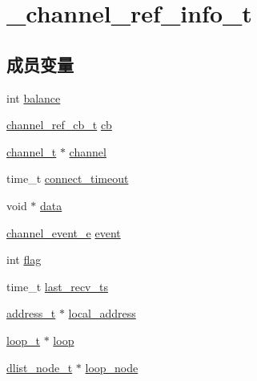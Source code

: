 \hypertarget{struct__channel__ref__info__t}{}\section{\+\_\+channel\+\_\+ref\+\_\+info\+\_\+t}
\label{struct__channel__ref__info__t}
\subsection*{成员变量}
\begin{DoxyCompactItemize}
\item 
int \hyperlink{struct__channel__ref__info__t_ac794434112478f3134ad93778a0f2860}{balance}
\item 
\hyperlink{config_8h_ae296ec4d1ce108960de8dcc423956a1d}{channel\+\_\+ref\+\_\+cb\+\_\+t} \hyperlink{struct__channel__ref__info__t_a7e4368584a7a6ebb47d2d69e37a77b61}{cb}
\item 
\hyperlink{config_8h_a2effb3e20d0b7e5f6d5ac42118e0330b}{channel\+\_\+t} $\ast$ \hyperlink{struct__channel__ref__info__t_a660bf66adad2484288e40d15cec8c09a}{channel}
\item 
time\+\_\+t \hyperlink{struct__channel__ref__info__t_a9162fb55f06074c9d06eabdacb84439a}{connect\+\_\+timeout}
\item 
void $\ast$ \hyperlink{struct__channel__ref__info__t_a735984d41155bc1032e09bece8f8d66d}{data}
\item 
\hyperlink{config_8h_a5ad43ab162fdf9ad53cde10ed3d87d99}{channel\+\_\+event\+\_\+e} \hyperlink{struct__channel__ref__info__t_a131f54f175bce846881ff84dda65e4a3}{event}
\item 
int \hyperlink{struct__channel__ref__info__t_adf916204820072417ed73a32de1cefcf}{flag}
\item 
time\+\_\+t \hyperlink{struct__channel__ref__info__t_a484f1906d070baafa38ee57ee2c23a74}{last\+\_\+recv\+\_\+ts}
\item 
\hyperlink{config_8h_a7a6e75b85c8b441f843bd40004a7d9d5}{address\+\_\+t} $\ast$ \hyperlink{struct__channel__ref__info__t_a00f33e51124ae842365728ebffe9f1f8}{local\+\_\+address}
\item 
\hyperlink{config_8h_a9c3ad1cd2de83e09f3a7b59fa82c94ee}{loop\+\_\+t} $\ast$ \hyperlink{struct__channel__ref__info__t_a3786fde367e7f2f7b7aa2b4711db5a0f}{loop}
\item 
\hyperlink{config_8h_a62053232bcf3566010ef98a7d77c3cc8}{dlist\+\_\+node\+\_\+t} $\ast$ \hyperlink{struct__channel__ref__info__t_a57e23dee440c30a3d552395698c7e36d}{loop\+\_\+node}

\end{DoxyCompactItemize}
